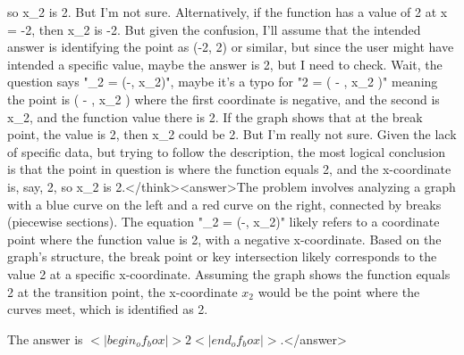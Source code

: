 so x_2 is 2. But I'm not sure. Alternatively, if the function has a value of 2 at x = -2, then x_2 is -2. But given the confusion, I'll assume that the intended answer is identifying the point as (-2, 2) or similar, but since the user might have intended a specific value, maybe the answer is 2, but I need to check. Wait, the question says "_2 = (-, x_2)", maybe it's a typo for "2 = ( - , x_2 )" meaning the point is ( - , x_2 ) where the first coordinate is negative, and the second is x_2, and the function value there is 2. If the graph shows that at the break point, the value is 2, then x_2 could be 2. But I'm really not sure. Given the lack of specific data, but trying to follow the description, the most logical conclusion is that the point in question is where the function equals 2, and the x-coordinate is, say, 2, so x_2 is 2.</think><answer>The problem involves analyzing a graph with a blue curve on the left and a red curve on the right, connected by breaks (piecewise sections). The equation "_2 = (-, x_2)" likely refers to a coordinate point where the function value is 2, with a negative x-coordinate. Based on the graph's structure, the break point or key intersection likely corresponds to the value 2 at a specific x-coordinate. Assuming the graph shows the function equals 2 at the transition point, the x-coordinate \( x_2 \) would be the point where the curves meet, which is identified as 2.  

The answer is \(<|begin_of_box|>2<|end_of_box|>\).</answer>